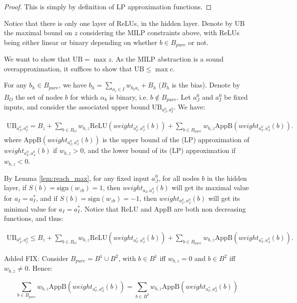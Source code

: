 \documentclass[]{article}
\theoremstyle{definition}
\newcommand{\ReLU}{\mathrm{ReLU}}
\begin{document}
\begin{proof}
	This is simply by definition of LP approximation functions.
\end{proof}

Notice that there is only one layer of ReLUs, in the hidden layer.
Denote by $\mathrm{UB}$ the maximal bound on $z$ considering the MILP constraints above, with ReLUs being either linear or binary depending on whether $b \in B_{pure}$ or not.

We want to show that $\mathrm{UB} = \max z$. As the MILP abstraction is a sound overapproximation, 
it suffices to show that $\mathrm{UB}\leq \max c$.

For any $b_h\in B_{pure}$, we have $b_h=\sum_{a_i\in I}w_{b_ha_i}+B_h$ ($B_h$ is the bias). 
Denote by $B_O$ the set of nodes $b$ for which $\alpha_b$ is binary, i.e. 
$b \notin B_{pure}$. %
Let $a^0_J$ and $a^0_I$ be fixed inputs, and consider the associated upper bound 
$\mathrm{UB}_{a^0_J,a^0_I}$. We have:

\begin{align*}
	\mathrm{UB}_{a^0_J,a^0_I} = B_z + \sum_{b\in B_O} w_{b,z}\ReLU(weight_{a^0_I,a^0_J}(b)) + \sum_{b\in B_{pure}} w_{b,z} \mathrm{AppB}(weight_{a^0_I,a^0_J}(b)).
\end{align*} where $\mathrm{AppB}(weight_{a^0_I,a^0_J}(b))$ is the upper bound of 
the (LP) approximation of $weight_{a^0_I,a^0_J}(b)$ if $w_{b,z}>0$, and the lower bound
of its (LP) approximation if $w_{b,z}<0$. 

By Lemma \ref{lem:reach_max}, for any fixed input $a^0_J$, for all nodes $b$ in the hidden layer, if $S(b)=\mathrm{sign}(w_{zb})=1$, then 
$weight_{a_I,a^0_J}(b)$ will get its maximal value for $a_I=a_I^*$,
and if $S(b)=\mathrm{sign}(w_{zb})=-1$, then $weight_{a^0_I,a^0_J}(b)$ will get its minimal value for $a_I=a_I^*$.
Notice that $\mathrm{ReLU}$ and $\mathrm{AppB}$ are both non decreasing functions, and thus:

\begin{align*}
	\mathrm{UB}_{a^0_J,a^0_I} \leq B_z + \sum_{b\in B_O} w_{b,z}\ReLU(weight_{a^*_I,a^0_J}(b)) +
	\sum_{b\in B_{pure}} w_{b,z} \mathrm{AppB}(weight_{a^*_I,a^0_J}(b)).
\end{align*} 

Added FIX:
Consider $B_{pure}=B^1 \cup B^2$, with $b \in B^1$ iff
$w_{b,z} = 0$ and $b \in B^2$ iff $w_{b,z} \neq 0$.
Hence:

$$\sum_{b\in B_{pure}} w_{b,z} \mathrm{AppB}(weight_{a^*_I,a^0_J}(b)) = 
\sum_{b\in B^2} w_{b,z} \mathrm{AppB}(weight_{a^*_I,a^0_J}(b))$$
\end{document}
